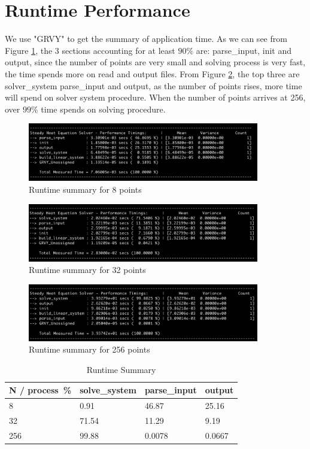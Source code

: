 \documentclass[a4paper]{article}
\begin{document}
\section{Runtime Performance}
We use "GRVY" to get the summary of application time. As we can see from Figure \ref{run8}, the 3 sections accounting for at least $90\%$ are: parse\_input, init and output, since the number of points are very small and solving process is very fast, the time spends more on read and output files. From Figure \ref{run32}, the top three are solver\_system parse\_input and output, as the number of points rises, more time will spend on solver system procedure. When the number of points arrives at 256, over $99\%$ time spends on solving procedure.

\begin{figure}[htbp]
\centering
\includegraphics[width=0.9\textwidth]{runtime8.png}
\caption{\label{run8}Runtime summary for 8 points}
\end{figure}

\begin{figure}[htbp]
\centering
\includegraphics[width=0.9\textwidth]{run32.png}
\caption{\label{run32}Runtime summary for 32 points}
\end{figure}

\begin{figure}[htbp]
\centering
\includegraphics[width=0.9\textwidth]{run256.png}
\caption{\label{run256}Runtime summary for 256 points}
\end{figure}

\begin{table}[htbp]
\centering
\begin{tabular}{l|lll}
\hline
N / process\ \% & solve\_system & parse\_input & output \\
\hline
8  & 0.91 & 46.87  & 25.16\\
32  & 71.54  & 11.29 & 9.19\\
256 & 99.88 & 0.0078 & 0.0667\\
\hline
\end{tabular}
\caption{\label{table2}Runtime Summary}
\end{table}
\end{document}
